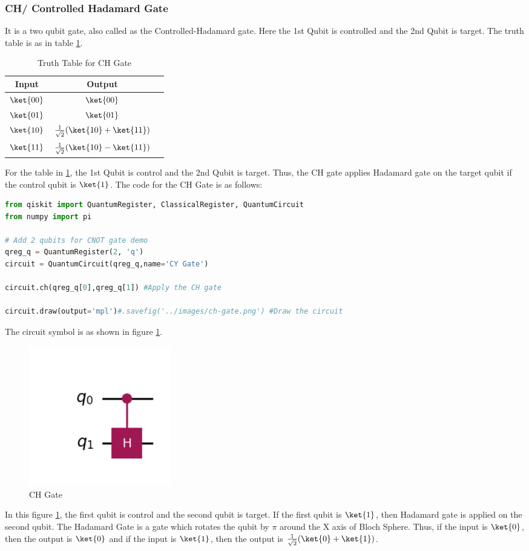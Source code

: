 \documentclass[12pt, oneside]{book}
\theoremstyle{definition}
\theoremstyle{definition}
\theoremstyle{remark}
\begin{document}
\subsubsection{CH/ Controlled Hadamard Gate}
It is a two qubit gate, also called as the Controlled-Hadamard gate.
Here the 1st Qubit is controlled and the 2nd Qubit is target.
The truth table is as in table \ref{tab:ch}.
\begin{table}[H]
    \centering
    \begin{tabular}{|c|c|c|}
        \hline
        Input & Output\\
        \hline
        $\ket{00}$ & $\ket{00}$\\
        $\ket{01}$   & $\ket{01}$\\
        $\ket{10}$   & $\frac{1}{\sqrt{2}}(\ket{10}+\ket{11})$\\
        $\ket{11}$  & $\frac{1}{\sqrt{2}}(\ket{10}-\ket{11})$\\
        \hline
    \end{tabular}
    \caption{Truth Table for CH Gate}
    \label{tab:ch}
\end{table}
For the table in \ref{tab:ch}, the 1st Qubit is control and the 2nd Qubit is target.
Thus, the CH gate applies Hadamard gate on the target qubit if the control qubit is $\ket{1}$.
The code for the CH Gate is as follows:
\begin{lstlisting}[language=Python]
from qiskit import QuantumRegister, ClassicalRegister, QuantumCircuit
from numpy import pi

# Add 2 qubits for CNOT gate demo
qreg_q = QuantumRegister(2, 'q')
circuit = QuantumCircuit(qreg_q,name='CY Gate')

circuit.ch(qreg_q[0],qreg_q[1]) #Apply the CH gate

circuit.draw(output='mpl')#.savefig('../images/ch-gate.png') #Draw the circuit
\end{lstlisting}

The circuit symbol is as shown in figure \ref{fig:ch}.
\begin{figure}[H]
    \centering
    \includegraphics[width=0.3\textwidth]{../images/ch-gate.png}
    \caption{CH Gate}
    \label{fig:ch}
\end{figure}
In this figure \ref{fig:ch}, the first qubit is control and the second qubit is target.
If the first qubit is $\ket{1}$, then Hadamard gate is applied on the second qubit. The Hadamard Gate
is a gate which rotates the qubit by $\pi$ around the X axis of Bloch Sphere. Thus, if
the input is $\ket{0}$, then the output is $\ket{0}$ and if the input is $\ket{1}$, then the output is $\frac{1}{\sqrt{2}}(\ket{0}+\ket{1})$.
\end{document}
